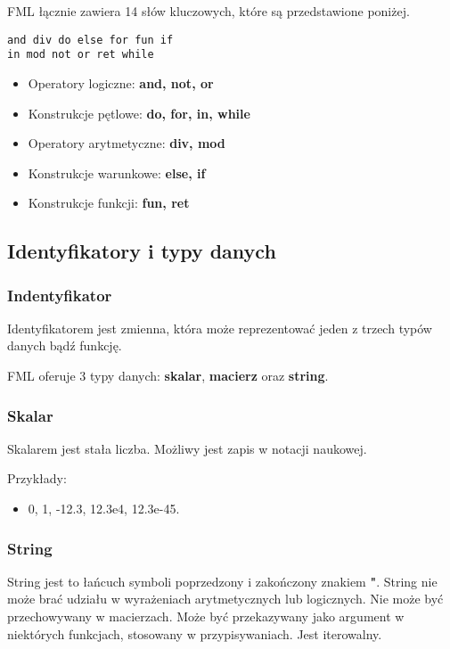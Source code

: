 \documentclass[12pt,a4paper]{article}
\begin{document}
FML łącznie zawiera 14 słów kluczowych, które są przedstawione poniżej.

\begin{lstlisting}
and div do else for fun if 
in mod not or ret while
\end{lstlisting}

\begin{itemize}
\item Operatory logiczne: \textbf{and, not, or}

\item Konstrukcje pętlowe: \textbf{do, for, in, while}

\item Operatory arytmetyczne: \textbf{div, mod}

\item Konstrukcje warunkowe: \textbf{else, if}

\item Konstrukcje funkcji: \textbf{fun, ret}

\end{itemize}
\pagebreak

%
%
\subsection{Identyfikatory i typy danych}

\subsubsection{Indentyfikator}

Identyfikatorem jest zmienna, która może reprezentować jeden z trzech typów danych bądź funkcję.

FML oferuje 3 typy danych: \textbf{skalar}, \textbf{macierz} oraz \textbf{string}.

\subsubsection{Skalar}

Skalarem jest stała liczba. Możliwy jest zapis w notacji naukowej.

Przykłady:
\begin{itemize}
\item 0, 1, -12.3, 12.3e4, 12.3e-45.
\end{itemize}

\subsubsection{String}
String jest to łańcuch symboli poprzedzony i zakończony znakiem \textbf{"}. 
String nie może brać udziału w wyrażeniach arytmetycznych lub logicznych. Nie może być przechowywany w macierzach. Może być przekazywany jako argument w niektórych funkcjach, stosowany w przypisywaniach. Jest iterowalny.
\end{document}
